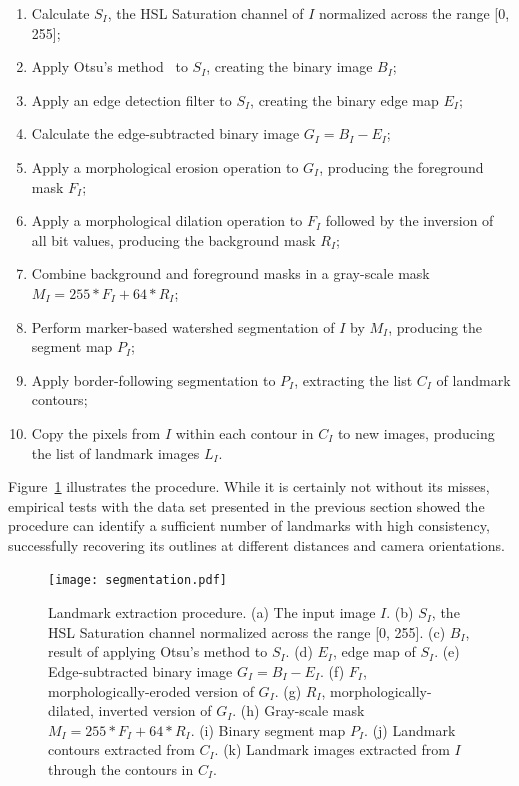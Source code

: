 \documentclass[twocolumn, 9pt]{jsproceedings}
\begin{document}
\begin{enumerate}
\item Calculate \(S_I\), the HSL Saturation channel of \(I\) normalized across the range [0, 255];
\item Apply Otsu's method~\cite{otsu79} to \(S_I\), creating the binary image \(B_I\);
\item Apply an edge detection filter to \(S_I\), creating the binary edge map \(E_I\);
\item Calculate the edge-subtracted binary image \(G_I = B_I - E_I\);
\item Apply a morphological erosion operation to \(G_I\), producing the foreground mask \(F_I\);
\item Apply a morphological dilation operation to \(F_I\) followed by the inversion of all bit values, producing the background mask \(R_I\);
\item Combine background and foreground masks in a gray-scale mask \(M_I = 255 * F_I + 64 * R_I\);
\item Perform marker-based watershed segmentation of \(I\) by \(M_I\), producing the segment map \(P_I\);
\item Apply border-following segmentation to \(P_I\), extracting the list \(C_I\) of landmark contours;
\item Copy the pixels from \(I\) within each contour in \(C_I\) to new images, producing the list of landmark images \(L_I\).
\end{enumerate}

Figure~\ref{fig:segmentation} illustrates the procedure. While it is certainly not without its misses, empirical tests with the data set presented in the previous section showed the procedure can identify a sufficient number of landmarks with high consistency, successfully recovering its outlines at different distances and camera orientations.

\begin{figure}[h!]
\texttt{[image: segmentation.pdf]}
\caption{Landmark extraction procedure. (a) The input image \(I\). (b) \(S_I\), the HSL Saturation channel normalized across the range [0, 255]. (c) \(B_I\), result of applying Otsu's method to \(S_I\). (d) \(E_I\), edge map of \(S_I\). (e) Edge-subtracted binary image \(G_I = B_I - E_I\). (f) \(F_I\), morphologically-eroded version of \(G_I\). (g) \(R_I\), morphologically-dilated, inverted version of \(G_I\). (h) Gray-scale mask \(M_I = 255 * F_I + 64 * R_I\). (i) Binary segment map \(P_I\). (j) Landmark contours extracted from \(C_I\). (k) Landmark images extracted from \(I\) through the contours in \(C_I\).}
\label{fig:segmentation}
\end{figure}
\end{document}
